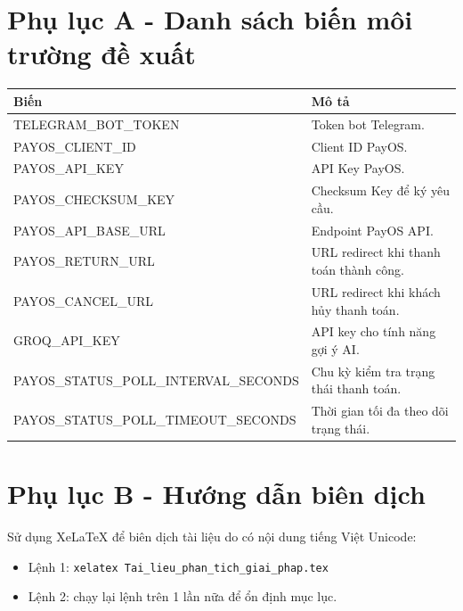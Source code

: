 \documentclass[12pt,a4paper]{article}
\begin{document}
\section{Phụ lục A - Danh sách biến môi trường đề xuất}
\begin{longtable}{p{4.2cm}p{7.8cm}}
\toprule
\textbf{Biến} & \textbf{Mô tả} \\
\midrule
TELEGRAM\_BOT\_TOKEN & Token bot Telegram. \\
PAYOS\_CLIENT\_ID & Client ID PayOS. \\
PAYOS\_API\_KEY & API Key PayOS. \\
PAYOS\_CHECKSUM\_KEY & Checksum Key để ký yêu cầu. \\
PAYOS\_API\_BASE\_URL & Endpoint PayOS API. \\
PAYOS\_RETURN\_URL & URL redirect khi thanh toán thành công. \\
PAYOS\_CANCEL\_URL & URL redirect khi khách hủy thanh toán. \\
GROQ\_API\_KEY & API key cho tính năng gợi ý AI. \\
PAYOS\_STATUS\_POLL\_INTERVAL\_SECONDS & Chu kỳ kiểm tra trạng thái thanh toán. \\
PAYOS\_STATUS\_POLL\_TIMEOUT\_SECONDS & Thời gian tối đa theo dõi trạng thái. \\
\bottomrule
\end{longtable}

\section{Phụ lục B - Hướng dẫn biên dịch}
Sử dụng XeLaTeX để biên dịch tài liệu do có nội dung tiếng Việt Unicode:
\begin{itemize}
    \item Lệnh 1: \texttt{xelatex Tai\_lieu\_phan\_tich\_giai\_phap.tex}
    \item Lệnh 2: chạy lại lệnh trên 1 lần nữa để ổn định mục lục.
\end{itemize}
\end{document}
